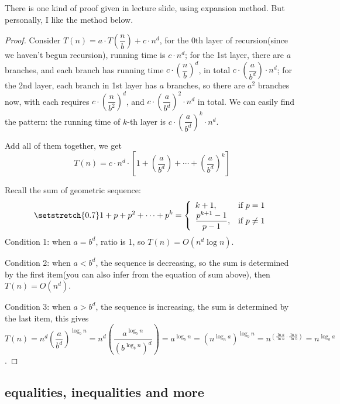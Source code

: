 \documentclass[11pt, a4paper]{COMP3711}
\begin{document}
\begin{spacing}{1.5}
    There is one kind of proof given in lecture slide, 
    using expansion method. But personally, I like the method below.

    \begin{proof}
    Consider $T(n)=a\cdot T\left(\dfrac{n}{b}\right)+c\cdot n^{d}$,
    for the 0th layer of recursion(since we haven't begun recursion),
    running time is $c\cdot n^{d}$;
    for the 1st layer, there are $a$ branches, and each
    branch has running time $c\cdot \left(\dfrac{n}{b}\right)^d$, 
    in total $c\cdot \left(\dfrac{a}{b^d}\right)\cdot n^d$;
    for the 2nd layer, each branch in 1st layer has $a$ branches,
    so there are $a^2$ branches now, with each requires 
    $c\cdot \left(\dfrac{n}{b^2}\right)^d$, and 
    $c\cdot \left(\dfrac{a}{b^d}\right)^2\cdot n^d$ in total.
    We can easily find the pattern: 
    the running time of $k$-th layer is 
    $c\cdot \left(\dfrac{a}{b^d}\right)^k\cdot n^d$.

    Add all of them together, we get 
    $$T(n)=c\cdot n^d\cdot \left[ 1+ \left(\dfrac{a}{b^d}\right)+\cdots + \left(\dfrac{a}{b^d}\right)^k\right]$$

    Recall the sum of geometric sequence: 
    \begin{align*}
        \setstretch{0.7}
        1+p+p^2+\cdots +p^k=\left\{
        \begin{array}{ll}
            k+1, & \text{if } p=1\\
            \dfrac{p^{k+1}-1}{p-1}, & \text{if } p\ne 1
        \end{array}\right.
    \end{align*}
    Condition 1: when $a=b^d$, ratio is 1, so $T(n)=O(n^d\log n)$.

    Condition 2: when $a<b^d$, the sequence is decreasing, 
    so the sum is determined by the first item(you can also 
    infer from the equation of sum above), then $T(n)=O(n^d)$.

    Condition 3: when $a>b^d$, the sequence is increasing, 
    the sum is determined by the last item, this gives 
    $T(n)=n^{d}\left(\dfrac{a}{b^{d}}\right)^{\log _{b} n}=
    n^{d}\left(\dfrac{a^{\log _{b} n}}{\left(b^{\log _{b} n}\right)^{d}}\right)=
    a^{\log _{b} n}=
    \left(n^{\log_n{a}}\right)^{\log_b{n}}=
    n^{\left(\frac{\ln a}{\ln n}\cdot \frac{\ln n}{\ln b}\right)}=
    n^{\log _{b} a}$.
    \end{proof}

    \subsection{equalities, inequalities and more}


\end{spacing}
\end{document}
